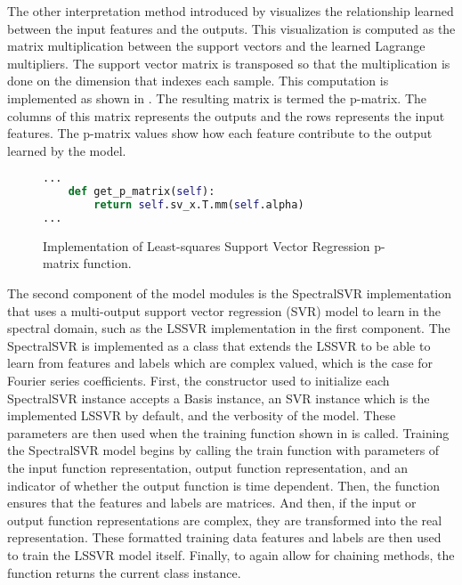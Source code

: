 The other interpretation method introduced by \textcite{ustunVisualisationInterpretationSupport2007} visualizes the relationship learned between the input features and the outputs. This visualization is computed as the matrix multiplication between the support vectors and the learned Lagrange multipliers. The support vector matrix is transposed so that the multiplication is done on the dimension that indexes each sample. This computation is implemented as shown in . The resulting matrix is termed the p-matrix. The columns of this matrix represents the outputs and the rows represents the input features. The p-matrix values show how each feature contribute to the output learned by the model.

\begin{figure}[H]
  \centering
  \begin{lstlisting}[language=Python]
...
    def get_p_matrix(self):
        return self.sv_x.T.mm(self.alpha)
...
  \end{lstlisting}
  \caption{Implementation of Least-squares Support Vector Regression p-matrix function.}\label{fig:lssvr_p_matrix_function_impl}
\end{figure}

The second component of the model modules is the SpectralSVR implementation that uses a multi-output support vector regression (SVR) model to learn in the spectral domain, such as the LSSVR implementation in the first component. The SpectralSVR is implemented as a class that extends the LSSVR to be able to learn from features and labels which are complex valued, which is the case for Fourier series coefficients. First, the constructor used to initialize each SpectralSVR instance accepts a Basis instance, an SVR instance which is the implemented LSSVR by default, and the verbosity of the model. These parameters are then used when the training function shown in  is called. Training the SpectralSVR model begins by calling the train function with parameters of the input function representation, output function representation, and an indicator of whether the output function is time dependent. Then, the function ensures that the features and labels are matrices. And then, if the input or output function representations are complex, they are transformed into the real representation. These formatted training data features and labels are then used to train the LSSVR model itself. Finally, to again allow for chaining methods, the function returns the current class instance.

